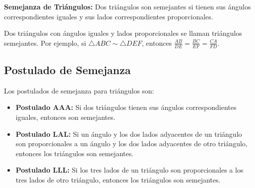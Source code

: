 \begin{definition}
    \textbf{Semejanza de Triángulos:} Dos triángulos son semejantes si tienen sus ángulos correspondientes iguales y sus lados correspondientes proporcionales.
\end{definition}

\begin{example}
    Dos triángulos con ángulos iguales y lados proporcionales se llaman triángulos semejantes. Por ejemplo, si \(\triangle ABC \sim \triangle DEF\), entonces \(\frac{AB}{DE} = \frac{BC}{EF} = \frac{CA}{FD}\).
\end{example}

\subsection{Postulado de Semejanza}

\begin{definition}
    Los postulados de semejanza para triángulos son:
    \begin{itemize}
        \item \textbf{Postulado AAA:} Si dos triángulos tienen sus ángulos correspondientes iguales, entonces son semejantes.
        \item \textbf{Postulado LAL:} Si un ángulo y los dos lados adyacentes de un triángulo son proporcionales a un ángulo y los dos lados adyacentes de otro triángulo, entonces los triángulos son semejantes.
        \item \textbf{Postulado LLL:} Si los tres lados de un triángulo son proporcionales a los tres lados de otro triángulo, entonces los triángulos son semejantes.
    \end{itemize}
\end{definition}


